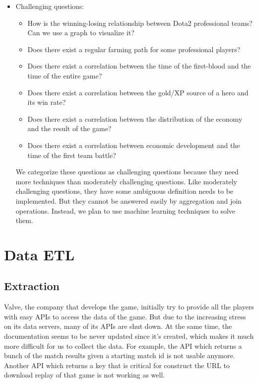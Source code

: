 \documentclass{article}
\begin{document}
\begin{itemize}
    \item Challenging questions:
    \begin{itemize}
        \item How is the winning-losing relationship between Dota2 professional teams? Can we use a graph to visualize it?
        \item Does there exist a regular farming path for some professional players?
        \item Does there exist a correlation between the time of the \gls{first-blood} and the time of the entire game?
        \item Does there exist a correlation between the \gls{gold}/\gls{XP} source of a hero and its win rate?
        \item Does there exist a correlation between the distribution of the economy and the result of the game?
        \item Does there exist a correlation between economic development and the time of the first \gls{team battle}?
    \end{itemize}
    We categorize these questions as challenging questions because they need more techniques than moderately challenging questions. Like moderately challenging questions, they have some ambiguous definition needs to be implemented. But they cannot be answered easily by aggregation and join operations. Instead, we plan to use machine learning techniques to solve them.
\end{itemize}


\section{Data ETL}

\subsection{Extraction}

Valve, the company that develops the game, initially try to provide all the players with easy APIs to access the data of the game.
But due to the increasing stress on its data servers, many of its APIs are shut down.
At the same time, the documentation seems to be never updated since it's created, which makes it much more difficult for us to collect the data.
For example, the API which returns a bunch of the match results given a starting match id is not usable anymore.
Another API which returns a key that is critical for construct the URL to download replay of that game is not working as well.
\end{document}
